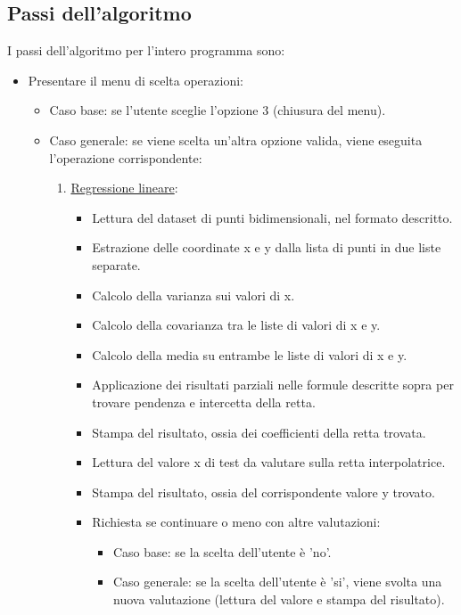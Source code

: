 \documentclass[11pt]{article}
\theoremstyle{definition}
\begin{document}
\subsection{Passi dell'algoritmo}
I passi dell'algoritmo per l'intero programma sono:
\begin{itemize}
\item Presentare il menu di scelta operazioni:
	\begin{itemize}
	\item Caso base: se l'utente sceglie l'opzione 3 (chiusura del menu).
	\item Caso generale: se viene scelta un'altra opzione valida, viene eseguita l'operazione corrispondente:
		\begin{enumerate}
		  \item \underline{Regressione lineare}: 
          \begin{itemize}
          \item Lettura del dataset di punti bidimensionali, nel formato descritto.
         \item Estrazione delle coordinate x e y dalla lista di punti in due liste separate.
         \item Calcolo della varianza sui valori di x.
         \item Calcolo della covarianza tra le liste di valori di x e y.
         \item Calcolo della media su entrambe le liste di valori di x e y.
         \item Applicazione dei risultati parziali nelle formule descritte sopra per trovare pendenza e intercetta della retta.
         \item Stampa del risultato, ossia dei coefficienti della retta trovata.
         \item Lettura del valore x di test da valutare sulla retta interpolatrice.
         \item Stampa del risultato, ossia del corrispondente valore y trovato. 
         \item Richiesta se continuare o meno con altre valutazioni:
            \begin{itemize}
            \item Caso base: se la scelta dell'utente è 'no'.
            \item Caso generale: se la scelta dell'utente è 'si', viene svolta una nuova valutazione (lettura del valore e stampa del risultato).
            \end{itemize}
       \end{itemize}

\end{enumerate}
\end{itemize}
\end{itemize}
\end{document}
